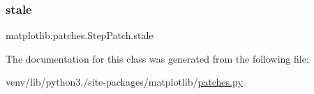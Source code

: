 \mbox{\label{classmatplotlib_1_1patches_1_1StepPatch_a7f6e4514d12bc9e724c60ac45e8210d3}} 
\subsubsection{\texorpdfstring{stale}{stale}}
{\footnotesize\ttfamily matplotlib.\+patches.\+Step\+Patch.\+stale}



The documentation for this class was generated from the following file\+:\begin{DoxyCompactItemize}
\item 
venv/lib/python3./site-\/packages/matplotlib/\hyperlink{patches_8py}{patches.\+py}\end{DoxyCompactItemize}
